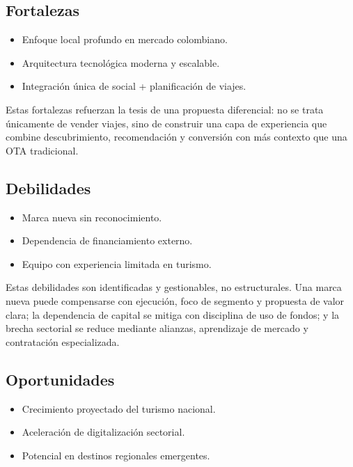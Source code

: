 \documentclass[12pt]{article}
\begin{document}
\subsection{Fortalezas}

\begin{itemize}
    \item Enfoque local profundo en mercado colombiano.
    \item Arquitectura tecnológica moderna y escalable.
    \item Integración única de social + planificación de viajes.
\end{itemize}

Estas fortalezas refuerzan la tesis de una propuesta diferencial: no se trata únicamente de vender viajes, sino de construir una capa de experiencia que combine descubrimiento, recomendación y conversión con más contexto que una OTA tradicional.

\subsection{Debilidades}

\begin{itemize}
    \item Marca nueva sin reconocimiento.
    \item Dependencia de financiamiento externo.
    \item Equipo con experiencia limitada en turismo.
\end{itemize}

Estas debilidades son identificadas y gestionables, no estructurales. Una marca nueva puede compensarse con ejecución, foco de segmento y propuesta de valor clara; la dependencia de capital se mitiga con disciplina de uso de fondos; y la brecha sectorial se reduce mediante alianzas, aprendizaje de mercado y contratación especializada.

\subsection{Oportunidades}

\begin{itemize}
    \item Crecimiento proyectado del turismo nacional.
    \item Aceleración de digitalización sectorial.
    \item Potencial en destinos regionales emergentes.
\end{itemize}
\end{document}
